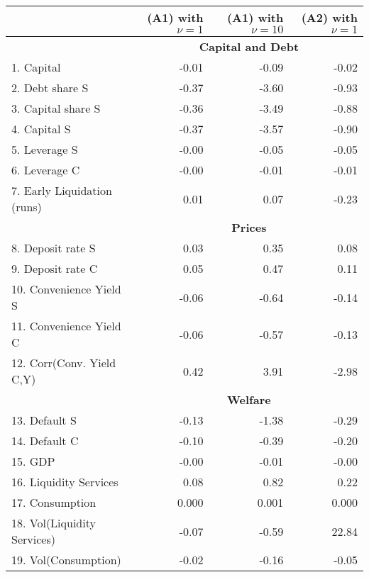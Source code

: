 \documentclass[letterpaper,12pt,dvipsnames,usenames]{article}
\theoremstyle{plain}
\begin{document}
\clearpage 
\newpage

\centering %
\begin{table}
	{\footnotesize
		\begin{tabular}{l|r|r|r}
			\toprule
			& (A1) with $\nu=1$ & (A1) with $\nu=10$ & (A2) with $\nu=1$  \\ \midrule
			& \multicolumn{3}{c}{\textbf{Capital and Debt}}   \\  \midrule
			1. Capital & -0.01 & -0.09  & -0.02     \\
			2. Debt share S & -0.37  &  -3.60  & -0.93    \\
			3. Capital share S & -0.36  & -3.49  &  -0.88  \\
			4. Capital S & -0.37 & -3.57  &  -0.90  \\
			5. Leverage S & -0.00  & -0.05  & -0.05  \\
			6. Leverage C & -0.00  & -0.01  &  -0.01  \\
			7. Early Liquidation (runs) & 0.01 & 0.07  & -0.23  \\  \midrule
			& \multicolumn{3}{c}{\textbf{Prices}}              \\  \midrule
			8. Deposit rate S & 0.03   &  0.35  & 0.08   \\
			9. Deposit rate C &  0.05  &  0.47  & 0.11  \\
			10. Convenience Yield S & -0.06  &  -0.64  & -0.14  \\
			11. Convenience Yield C & -0.06  &  -0.57  & -0.13 \\   
			12. Corr(Conv. Yield C,Y) & 0.42 & 3.91  &  -2.98  \\ \midrule 
			& \multicolumn{3}{c}{\textbf{Welfare}}            \\  \midrule
			13. Default S & -0.13  &  -1.38  & -0.29  \\
			14. Default C & -0.10   &  -0.39  &  -0.20   \\
			15. GDP & -0.00 & -0.01  & -0.00   \\
			16. Liquidity Services & 0.08  & 0.82  & 0.22  \\
			17. Consumption & 0.000  & 0.001  & 0.000  \\
			18. Vol(Liquidity Services) & -0.07  & -0.59  & 22.84   \\
			19. Vol(Consumption) & -0.02 & -0.16  &  -0.05  \\
			\bottomrule
		\end{tabular}%
}
\end{table}
\end{document}
